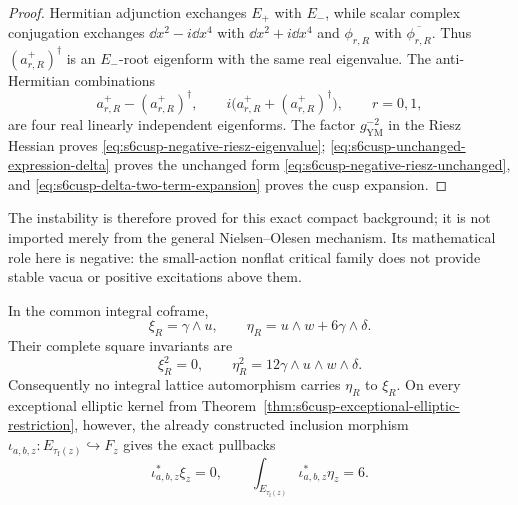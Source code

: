 \begin{proof}
Hermitian adjunction exchanges \(E_+\) with \(E_-\), while scalar complex
conjugation exchanges \(\dd x^2-i\dd x^4\) with
\(\dd x^2+i\dd x^4\) and \(\phi_{r,R}\) with
\(\overline{\phi_{r,R}}\).  Thus \((a_{r,R}^+)^\dagger\) is an
\(E_-\)-root eigenform with the same real eigenvalue.  The anti-Hermitian
combinations
\[
 a_{r,R}^+-(a_{r,R}^+)^\dagger,
 \qquad
 i\bigl(a_{r,R}^++(a_{r,R}^+)^\dagger\bigr),
 \qquad r=0,1,
\]
are four real linearly independent eigenforms.  The factor
\(g_{\mathrm{YM}}^{-2}\) in the Riesz Hessian proves
\eqref{eq:s6cusp-negative-riesz-eigenvalue};
\eqref{eq:s6cusp-unchanged-expression-delta} proves the unchanged form
\eqref{eq:s6cusp-negative-riesz-unchanged}, and
\eqref{eq:s6cusp-delta-two-term-expansion} proves the cusp expansion.
\end{proof}

The instability is therefore proved for this exact compact background; it
is not imported merely from the general Nielsen--Olesen mechanism.  Its
mathematical role here is negative: the small-action nonflat critical family
does not provide stable vacua or positive excitations above them.

\begin{proposition}
\label{prop:s6cusp-decomposable-native-relation}
In the common integral coframe,
\begin{equation}\label{eq:s6cusp-two-flux-classes}
 \xi_R=\gamma\wedge u,
 \qquad
 \eta_R=u\wedge w+6\gamma\wedge\delta.
\end{equation}
Their complete square invariants are
\begin{equation}\label{eq:s6cusp-two-flux-squares}
 \xi_R^2=0,
 \qquad
 \eta_R^2=12\gamma\wedge u\wedge w\wedge\delta.
\end{equation}
Consequently no integral lattice automorphism carries \(\eta_R\) to
\(\xi_R\).  On every exceptional elliptic kernel from
Theorem~\ref{thm:s6cusp-exceptional-elliptic-restriction}, however, the
already constructed inclusion morphism
\(\iota_{a,b,z}:E_{\tau_{\mathrm f}(z)}\hookrightarrow F_z\) gives the
exact pullbacks
\begin{equation}\label{eq:s6cusp-two-flux-kernel-pullbacks}
 \iota_{a,b,z}^*\xi_z=0,
 \qquad
 \int_{E_{\tau_{\mathrm f}(z)}}\iota_{a,b,z}^*\eta_z=6.
\end{equation}
\end{proposition}

